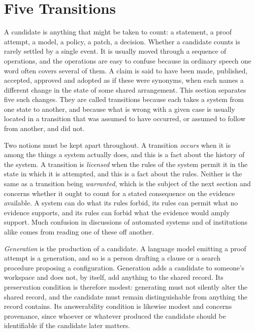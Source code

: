 \section{Five Transitions}

A candidate is anything that might be taken to count: a statement, a proof attempt, a model, a policy, a patch, a decision. Whether a candidate counts is rarely settled by a single event. It is usually moved through a sequence of operations, and the operations are easy to confuse because in ordinary speech one word often covers several of them. A claim is said to have been made, published, accepted, approved and adopted as if these were synonyms, when each names a different change in the state of some shared arrangement. This section separates five such changes. They are called transitions because each takes a system from one state to another, and because what is wrong with a given case is usually located in a transition that was assumed to have occurred, or assumed to follow from another, and did not.

Two notions must be kept apart throughout. A transition \emph{occurs} when it is among the things a system actually does, and this is a fact about the history of the system. A transition is \emph{licensed} when the rules of the system permit it in the state in which it is attempted, and this is a fact about the rules. Neither is the same as a transition being \emph{warranted}, which is the subject of the next section and concerns whether it ought to count for a stated consequence on the evidence available. A system can do what its rules forbid, its rules can permit what no evidence supports, and its rules can forbid what the evidence would amply support. Much confusion in discussions of automated systems and of institutions alike comes from reading one of these off another.

\emph{Generation} is the production of a candidate. A language model emitting a proof attempt is a generation, and so is a person drafting a clause or a search procedure proposing a configuration. Generation adds a candidate to someone's workspace and does not, by itself, add anything to the shared record. Its preservation condition is therefore modest: generating must not silently alter the shared record, and the candidate must remain distinguishable from anything the record contains. Its answerability condition is likewise modest and concerns provenance, since whoever or whatever produced the candidate should be identifiable if the candidate later matters.


